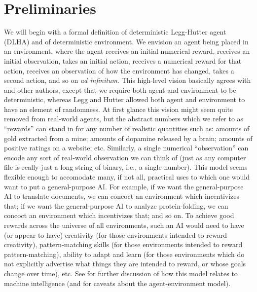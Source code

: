 \documentclass[twoside,11pt]{article}
\begin{document}
\section{Preliminaries}
\label{preliminariessection}

We will begin with a formal definition of deterministic Legg-Hutter agent
(DLHA) and of
deterministic environment.
We envision an agent being placed in an environment, where the agent
receives an initial numerical reward, receives an initial observation, takes an initial
action, receives a numerical reward for that action, receives an observation of how the
environment has changed, takes a second action, and so on \emph{ad infinitum}.
This high-level vision basically agrees with \citet{hutter2007}
and other authors,
except that we require both agent and environment to
be deterministic, whereas Legg and Hutter allowed both agent and environment to have
an element of randomness.
At first glance this vision might seem quite removed from real-world
agents, but the abstract numbers which we refer to as ``rewards'' can
stand in for any number of realistic quantities such as: amounts of gold
extracted from a mine; amounts of dopamine released by a brain; amounts of positive
ratings on a website; etc. Similarly, a single numerical ``observation'' can
encode any sort of real-world observation we can think of (just as any computer file
is really just a long string of binary, i.e., a single number).
This model seems flexible enough to accomodate many, if not all, practical uses
to which one would want to put a general-purpose AI.
For example, if we want the general-purpose AI to translate documents, we can concoct
an environment which incentivizes that; if we want the general-purpose AI to analyze
protein-folding, we can concoct an environment which incentivizes that; and so on.
To achieve good rewards across the universe of all environments,
such an AI would need to have (or appear to have) creativity (for those
environments intended to reward creativity),
pattern-matching skills (for those environments intended to reward pattern-matching),
ability to adapt and learn (for those environments which do not explicitly
advertise what things they are intended to reward, or whose goals change over time), etc.
See \citet{hutter2007} for further discussion of how this model relates
to machine intelligence (and for caveats about the agent-environment
model).
\end{document}
